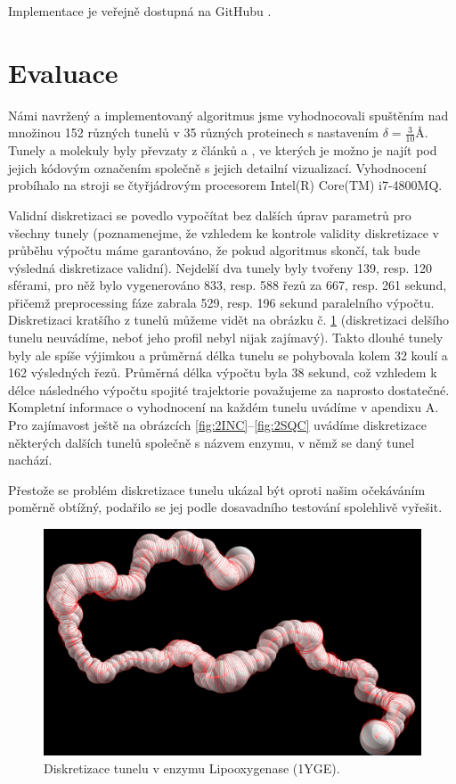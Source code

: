 Implementace je veřejně dostupná na GitHubu \cite{discretizer}.





\section{Evaluace} \label{subsec:evaluation}
Námi navržený a implementovaný algoritmus jsme vyhodnocovali spuštěním nad
množinou 152 různých tunelů v 35 různých proteinech s nastavením $ \delta = \frac{3}{10}$Å.
Tunely a molekuly byly převzaty z článků \cite{Enzymes} a \cite{Caver}, ve
kterých je možno
je najít pod jejich kódovým označením společně s jejich detailní vizualizací.
Vyhodnocení probíhalo na stroji se čtyřjádrovým procesorem Intel(R) Core(TM) i7-4800MQ.

Validní diskretizaci se povedlo vypočítat bez dalších úprav parametrů pro všechny
tunely (poznamenejme, že vzhledem ke kontrole validity diskretizace v průběhu výpočtu
máme garantováno, že pokud algoritmus skončí, tak bude výsledná diskretizace validní).
Nejdelší dva tunely byly tvořeny 139, resp. 120 sférami, pro něž bylo
vygenerováno 833, resp. 588 řezů za 667, resp. 261 sekund, přičemž preprocessing
fáze zabrala 529, resp. 196 sekund paralelního výpočtu. Diskretizaci kratšího
z tunelů můžeme vidět na obrázku č. \ref{fig:1YGE} (diskretizaci delšího tunelu
neuvádíme, neboť jeho profil nebyl nijak zajímavý). Takto dlouhé tunely byly ale
spíše výjimkou a průměrná délka tunelu se pohybovala kolem 32 koulí a 162
výsledných řezů. Průměrná délka výpočtu byla 38 sekund, což vzhledem k délce
následného výpočtu spojité trajektorie považujeme za naprosto dostatečné.
Kompletní informace o vyhodnocení na každém tunelu uvádíme v apendixu A.
Pro zajímavost ještě na obrázcích \ref{fig:2INC}–\ref{fig:2SQC} uvádíme
diskretizace některých dalších tunelů společně s názvem enzymu, v němž se daný
tunel nachází.

Přestože se problém diskretizace tunelu ukázal být oproti našim očekáváním
poměrně obtížný, podařilo se jej podle dosavadního testování spolehlivě vyřešit.

\begin{figure}[ht]
    \centering
    \includegraphics[width=.75\textwidth]{img/1YGE.png}
    \caption{Diskretizace tunelu v enzymu Lipooxygenase (1YGE).}
  \centering
  \label{fig:1YGE}
\end{figure}

